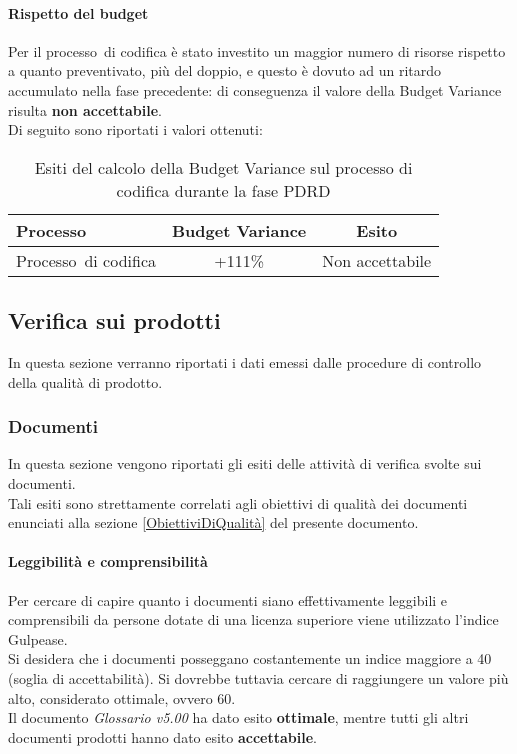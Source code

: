 \documentclass[../PianoDiQualifica.tex]{subfiles}
\begin{document}
\begin{appendices}
			\paragraph{Rispetto del budget}
			Per il processo\g\ di codifica è stato investito un maggior numero di risorse rispetto a quanto preventivato, più del doppio, e questo è dovuto ad un ritardo accumulato nella fase precedente: di conseguenza il valore della Budget Variance risulta \textbf{non accettabile}.\\
			Di seguito sono riportati i valori ottenuti:
			\begin{table}[H]
				\centering
				\begin{tabular}{l * {2}{c}}
					\toprule
					\textbf{Processo} & \textbf{Budget Variance} & \textbf{Esito} \\
					\midrule
					Processo\g\ di codifica & +111\% &  Non accettabile \\
					\bottomrule
				\end{tabular}
				\caption{Esiti del calcolo della Budget Variance sul processo di codifica durante la fase PDRD}
				\label{tab:esiti_budget_variance}
			\end{table}
			
			
	\subsection{Verifica sui prodotti}
	In questa sezione verranno riportati i dati emessi dalle procedure di controllo della qualità di prodotto\g.
	
		\subsubsection{Documenti}
		In questa sezione vengono riportati gli esiti delle attività di verifica svolte sui documenti.\\
		Tali esiti sono strettamente correlati agli obiettivi di qualità dei documenti enunciati alla sezione \ref{ObiettiviDiQualità} del presente documento.
			
			\paragraph{Leggibilità e comprensibilità}
			Per cercare di capire quanto i documenti siano effettivamente leggibili e comprensibili da persone dotate di una licenza superiore viene utilizzato l'indice Gulpease\g.\\
			Si desidera che i documenti posseggano costantemente un indice maggiore a 40 (soglia di accettabilità). Si dovrebbe tuttavia cercare di raggiungere un valore più alto, considerato ottimale, ovvero 60.\\
			Il documento \textit{Glossario v5.00} ha dato esito \textbf{ottimale}, mentre tutti gli altri documenti prodotti hanno dato esito \textbf{accettabile}.
			

\end{appendices}
\end{document}
